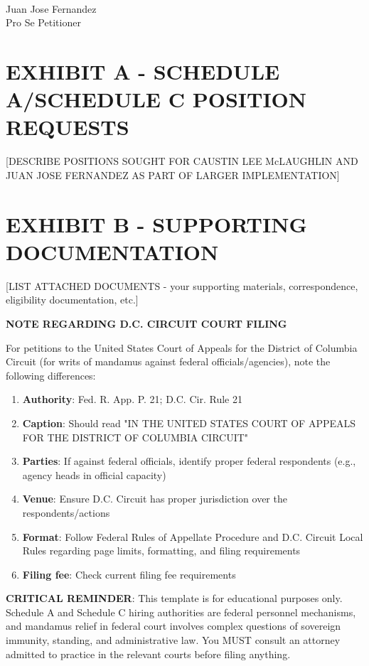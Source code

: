 \documentclass[12pt]{article}
\begin{document}
\underline{\hspace{3in}} \\
Juan Jose Fernandez \\
Pro Se Petitioner

\newpage

\section*{EXHIBIT A - SCHEDULE A/SCHEDULE C POSITION REQUESTS}
[DESCRIBE POSITIONS SOUGHT FOR CAUSTIN LEE McLAUGHLIN AND JUAN JOSE FERNANDEZ AS PART OF LARGER IMPLEMENTATION]

\section*{EXHIBIT B - SUPPORTING DOCUMENTATION}
[LIST ATTACHED DOCUMENTS - your supporting materials, correspondence, eligibility documentation, etc.]

\newpage

\begin{center}
\textbf{\Large NOTE REGARDING D.C. CIRCUIT COURT FILING}
\end{center}

For petitions to the United States Court of Appeals for the District of Columbia Circuit (for writs of mandamus against federal officials/agencies), note the following differences:

\begin{enumerate}
    \item \textbf{Authority}: Fed. R. App. P. 21; D.C. Cir. Rule 21
    \item \textbf{Caption}: Should read "IN THE UNITED STATES COURT OF APPEALS FOR THE DISTRICT OF COLUMBIA CIRCUIT"
    \item \textbf{Parties}: If against federal officials, identify proper federal respondents (e.g., agency heads in official capacity)
    \item \textbf{Venue}: Ensure D.C. Circuit has proper jurisdiction over the respondents/actions
    \item \textbf{Format}: Follow Federal Rules of Appellate Procedure and D.C. Circuit Local Rules regarding page limits, formatting, and filing requirements
    \item \textbf{Filing fee}: Check current filing fee requirements
\end{enumerate}

\vspace{0.5in}

\textbf{CRITICAL REMINDER}: This template is for educational purposes only. Schedule A and Schedule C hiring authorities are federal personnel mechanisms, and mandamus relief in federal court involves complex questions of sovereign immunity, standing, and administrative law. You MUST consult an attorney admitted to practice in the relevant courts before filing anything.
\end{document}
